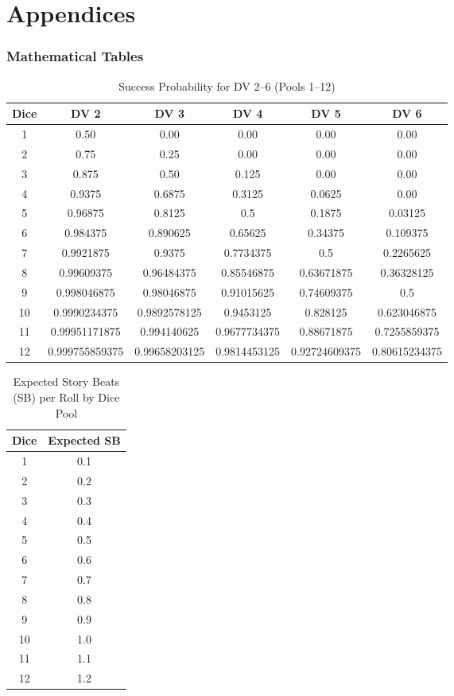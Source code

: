 \documentclass[11pt]{article}
\begin{document}
\newpage
\part*{Appendices}

\appendix
\section{Mathematical Tables}

\begin{table}[h]
\centering
\caption{Success Probability for DV 2–6 (Pools 1–12)}
\begin{tabular}{cccccc}
\toprule
\textbf{Dice} & \textbf{DV 2} & \textbf{DV 3} & \textbf{DV 4} & \textbf{DV 5} & \textbf{DV 6} \\
\midrule
1 & 0.50 & 0.00 & 0.00 & 0.00 & 0.00 \\
2 & 0.75 & 0.25 & 0.00 & 0.00 & 0.00 \\
3 & 0.875 & 0.50 & 0.125 & 0.00 & 0.00 \\
4 & 0.9375 & 0.6875 & 0.3125 & 0.0625 & 0.00 \\
5 & 0.96875 & 0.8125 & 0.5 & 0.1875 & 0.03125 \\
6 & 0.984375 & 0.890625 & 0.65625 & 0.34375 & 0.109375 \\
7 & 0.9921875 & 0.9375 & 0.7734375 & 0.5 & 0.2265625 \\
8 & 0.99609375 & 0.96484375 & 0.85546875 & 0.63671875 & 0.36328125 \\
9 & 0.998046875 & 0.98046875 & 0.91015625 & 0.74609375 & 0.5 \\
10 & 0.9990234375 & 0.9892578125 & 0.9453125 & 0.828125 & 0.623046875 \\
11 & 0.99951171875 & 0.994140625 & 0.9677734375 & 0.88671875 & 0.7255859375 \\
12 & 0.999755859375 & 0.99658203125 & 0.9814453125 & 0.92724609375 & 0.80615234375 \\
\bottomrule
\end{tabular}
\end{table}

\begin{table}[h]
\centering
\caption{Expected Story Beats (SB) per Roll by Dice Pool}
\begin{tabular}{cc}
\toprule
\textbf{Dice} & \textbf{Expected SB} \\
\midrule
1 & 0.1 \\
2 & 0.2 \\
3 & 0.3 \\
4 & 0.4 \\
5 & 0.5 \\
6 & 0.6 \\
7 & 0.7 \\
8 & 0.8 \\
9 & 0.9 \\
10 & 1.0 \\
11 & 1.1 \\
12 & 1.2 \\
\bottomrule
\end{tabular}
\end{table}
\end{document}
